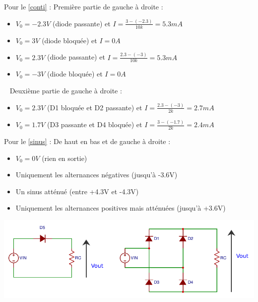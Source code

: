 \documentclass{../template/tp}
\begin{document}
{%
Pour le \ref{conti} :
Première partie de gauche à droite :
\begin{itemize}
    \item $V_0 = -2.3V$ (diode passante) et $I = \frac{3-(-2.3)}{10k}=5.3mA$
    \item $V_0 = 3V$ (diode bloquée) et $I=0A$
    \item $V_0 = 2.3V$ (diode passante) et $I= \frac{2.3-(-3)}{10k}=5.3mA$
    \item $V_0 = -3V$ (diode bloquée) et $I = 0A$
\end{itemize}
~\newline
Deuxième partie de gauche à droite :
\begin{itemize}
    \item $V_0 = 2.3V$ (D1 bloquée et D2 passante) et $I = \frac{2.3-(-3)}{2k} = 2.7mA$
    \item $V_0 = 1.7V$ (D3 passante et D4 bloquée) et $I = \frac{3-(-1.7)}{2k} = 2.4mA$
\end{itemize}

Pour le \ref{sinus} :
De haut en bas et de gauche à droite :
    \begin{itemize}
        \item $V_0 = 0V$ (rien en sortie)
        \item Uniquement les alternances négatives (jusqu'à -3.6V)
        \item Un sinus atténué (entre +4.3V et -4.3V)
        \item Uniquement les alternances positives mais atténuées (jusqu'à +3.6V)
    \end{itemize}

}

{%
\begin{center}
    \includegraphics[width=\linewidth]{redr}
\end{center}
}
\end{document}
